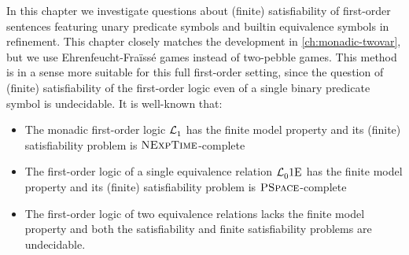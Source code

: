 In this chapter we investigate questions about (finite) satisfiability of
first-order sentences featuring unary predicate symbols and builtin equivalence
symbols in refinement.
This chapter closely matches the development in \cref{ch:monadic-twovar}, but
we use Ehrenfeucht-Fra\"{i}ss\'{e} games instead of two-pebble games.
This method is in a sense more suitable for this full first-order setting, since
the question of (finite) satisfiability of the first-order logic even of a
single binary predicate symbol is undecidable.
It is well-known that:
\begin{itemize}
  \item The monadic first-order logic $\mathcal{L}^{{}}_{1}$ has the finite model
  property and its (finite) satisfiability problem is $\text{\normalfont{\scshape NExpTime}}$-complete
  \item The first-order logic of a single equivalence relation
  $\mathcal{L}^{{}}_{0}{1}\mathrm{E}_{{}}$ has the finite model property and its (finite)
  satisfiability problem is $\text{\normalfont{\scshape PSpace}}$-complete
  \item The first-order logic of two equivalence relations lacks the finite
  model property and both the satisfiability and finite satisfiability problems
  are undecidable.
\end{itemize}